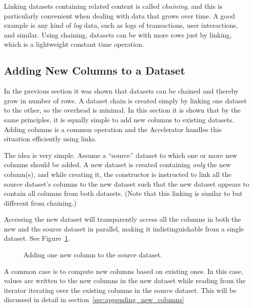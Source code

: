 Linking datasets containing related content is called \emph{chaining},
and this is particularly convenient when dealing with data that grows
over time.  A good example is any kind of \emph{log} data, such as
logs of transactions, user interactions, and similar.  Using chaining,
datasets can be with more rows just by linking, which is a lightweight
constant time operation.



\subsection{Adding New Columns to a Dataset}
In the previous section it was shown that datasets can be chained and
thereby grow in number of rows.  A dataset chain is created simply by
linking one dataset to the other, so the overhead is minimal.  In this
section it is shown that by the same principles, it is equally simple
to add new columns to existing datasets.  Adding columns is a common
operation and the Accelerator handles this situation efficiently using
links.

The idea is very simple.  Assume a ``source'' dataset to which one or
more new columns should be added.  A new dataset is created containing
\textsl{only} the new column(s), and while creating it, the
constructor is instructed to link all the source dataset's columns to
the new dataset such that the new dataset appears to contain all
columns from both datasets.  (Note that this linking is similar to but
different from chaining.)

Accessing the new dataset will transparently access all the columns in
both the new and the source dataset in parallel, making it
indistinguishable from a single dataset.  See
Figure~\ref{fig:dep_dataset_append_column}.

\begin{figure}[b]
  \begin{center}
    
    \caption{Adding one new column to the source dataset.}
    \label{fig:dep_dataset_append_column}
  \end{center}
\end{figure}

A common case is to compute new columns based on existing ones.  In
this case, values are written to the new columns in the new dataset
while reading from the iterator iterating over the existing columns in
the source dataset.  This will be discussed in detail in
section~\ref{sec:appending_new_columns}



